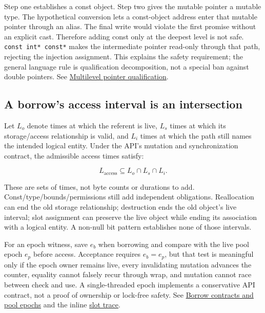 Step one establishes a const object. Step two gives the mutable pointer a mutable type. The hypothetical conversion lets a const-object address enter that mutable pointer through an alias. The final write would violate the first promise without an explicit cast. Therefore adding const only at the deepest level is not safe. \texttt{const\ int*\ const*} makes the intermediate pointer read-only through that path, rejecting the injection assignment. This explains the safety requirement; the general language rule is qualification decomposition, not a special ban against double pointers. See \hyperref[appendix-5e1a7561cd98]{Multilevel pointer qualification}.

\subsection{A borrow's access interval is an intersection}\label{01-foundations-i-ch011-a-borrows-access-interval-is-an-intersection}

\hypertarget{01-foundations-i-ch011-a-borrows-access-interval-is-an-intersection}{}

Let \(L_o\) denote times at which the referent is live, \(L_s\) times at which its storage/access relationship is valid, and \(L_i\) times at which the path still names the intended logical entity. Under the API's mutation and synchronization contract, the admissible access times satisfy:

\[
L_{\mathrm{access}}\subseteq L_o\cap L_s\cap L_i.
\]

These are sets of times, not byte counts or durations to add. Const/type/bounds/permissions still add independent obligations. Reallocation can end the old storage relationship; destruction ends the old object's live interval; slot assignment can preserve the live object while ending its association with a logical entity. A non-null bit pattern establishes none of those intervals.

For an epoch witness, save \(e_b\) when borrowing and compare with the live pool epoch \(e_p\) before access. Acceptance requires \(e_b=e_p\), but that test is meaningful only if the epoch owner remains live, every invalidating mutation advances the counter, equality cannot falsely recur through wrap, and mutation cannot race between check and use. A single-threaded epoch implements a conservative API contract, not a proof of ownership or lock-free safety. See \hyperref[appendix-aa405b7c3903]{Borrow contracts and pool epochs} and the inline \hyperref[01-foundations-i-ch003-when-a-valid-borrow-stops-naming-the-intended-thing]{slot trace}.

